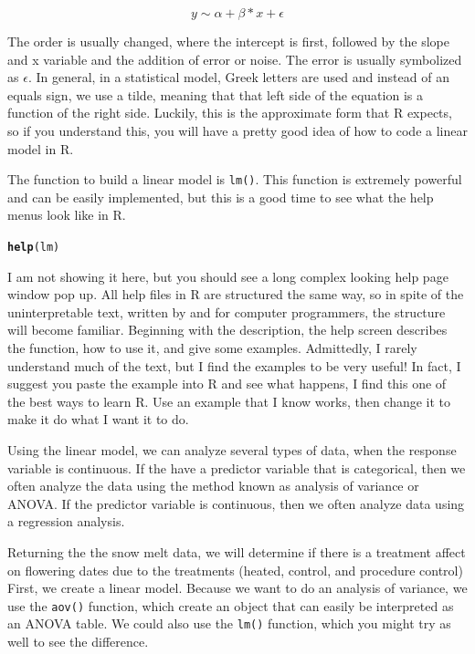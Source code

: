 \documentclass{tufte-handout}\usepackage[]{graphicx}\usepackage[]{xcolor}
\makeatletter
\newcommand{\hlstd}[1]{\textcolor[rgb]{0.345,0.345,0.345}{#1}}%
\newcommand{\hlkwd}[1]{\textcolor[rgb]{0.737,0.353,0.396}{\textbf{#1}}}%
\newenvironment{kframe}{%
 \def\at@end@of@kframe{}%
 \ifinner\ifhmode%
  \def\at@end@of@kframe{\end{minipage}}%
  \begin{minipage}{\columnwidth}%
 \fi\fi%
 \def\FrameCommand##1{\hskip\@totalleftmargin \hskip-\fboxsep
 \colorbox{shadecolor}{##1}\hskip-\fboxsep
     \hskip-\linewidth \hskip-\@totalleftmargin \hskip\columnwidth}%
 \MakeFramed {\advance\hsize-\width
   \@totalleftmargin\z@ \linewidth\hsize
   \@setminipage}}%
 {\par\unskip\endMakeFramed%
 \at@end@of@kframe}
\newenvironment{knitrout}{}{} %
\makeatother
\begin{document}
\begin{equation}
y \sim \alpha + \beta * x + \epsilon
\end{equation}

The order is usually changed, where the intercept is first, followed by the slope and x variable and the addition of error or noise. The error is usually symbolized as $\epsilon$. In general, in a statistical model, Greek letters are used and instead of an equals sign, we use a tilde, meaning that that left side of the equation is a function of the right side. Luckily, this is the approximate form that R expects, so if you understand this, you will have a pretty good idea of how to code a linear model in R. 

The function to build a linear model is \texttt{lm()}. This function is extremely powerful and can be easily implemented, but this is a good time to see what the help menus look like in R. 

\begin{knitrout}
\color{fgcolor}\begin{kframe}
\begin{alltt}
\hlkwd{help}\hlstd{(lm)}
\end{alltt}
\end{kframe}
\end{knitrout}

I am not showing it here, but you should see a long complex looking help page window pop up. All help files in R are structured the same way, so in spite of the uninterpretable text, written by and for computer programmers, the structure will become familiar. Beginning with the description, the help screen describes the function, how to use it, and give some examples. Admittedly, I rarely understand much of the text, but I find the examples to be very useful! In fact, I suggest you paste the example into R and see what happens, I find this one of the best ways to learn R. Use an example that I know works, then change it to make it do what I want it to do.

Using the linear model, we can analyze several types of data, when the response variable is continuous. If the have a predictor variable that is categorical, then we often analyze the data using the method known as analysis of variance or ANOVA. If the predictor variable is continuous, then we often analyze data using a regression analysis. 

Returning the the snow melt data, we will determine if there is a treatment affect on flowering dates due to the treatments (heated, control, and procedure control) First, we create a linear model. Because we want to do an analysis of variance, we use the \texttt{aov()} function, which create an object that can easily be interpreted as an ANOVA table. We could also use the \texttt{lm()} function, which you might try as well to see the difference. 
\end{document}
